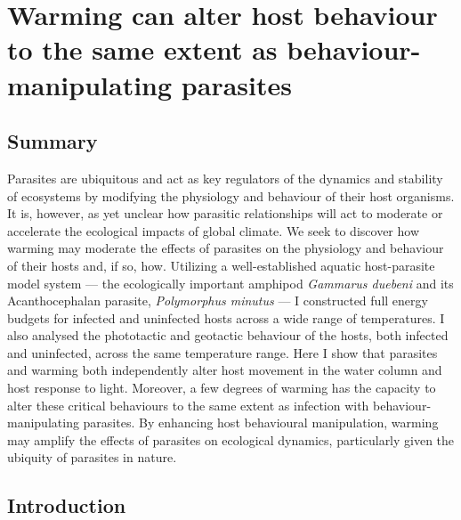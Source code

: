 \chapter[Warming can alter host behaviour to the same extent as behaviour-manipulating parasites]{Warming can alter host behaviour to the same extent as behaviour-manipulating parasites}
\label{chap:physbeh}

\section{Summary}
Parasites are ubiquitous and act as key regulators of the dynamics and stability of ecosystems by modifying the physiology and behaviour of their host organisms. It is, however, as yet unclear how parasitic relationships will act to moderate or accelerate the ecological impacts of global climate. We seek to discover how warming may moderate the effects of parasites on the physiology and behaviour of their hosts and, if so, how. Utilizing a well-established aquatic host-parasite model system --- the ecologically important amphipod \emph{Gammarus duebeni} and its Acanthocephalan parasite, \emph{Polymorphus minutus} --- I constructed full energy budgets for infected and uninfected hosts across a wide range of temperatures. I also analysed the phototactic and geotactic behaviour of the hosts, both infected and uninfected, across the same temperature range. Here I show that parasites and warming both independently alter host movement in the water column and host response to light. Moreover, a few degrees of warming has the capacity to alter these critical behaviours to the same extent as infection with behaviour-manipulating parasites. By enhancing host behavioural manipulation, warming may amplify the effects of parasites on ecological dynamics, particularly given the ubiquity of parasites in nature. 


\section{Introduction}

